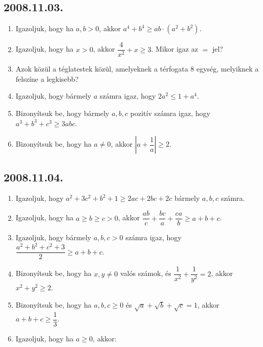 \subsection*{2008.11.03.}
\begin{enumerate}
\item Igazoljuk, hogy ha $a,b>0$, akkor $a^4+b^4\geq ab\cdot(a^2+b^2)$. 
\item Igazoljuk, hogy ha $x>0$, akkor $\dfrac{4}{x^2}+x\geq 3$. Mikor igaz az $=$ jel?
\item Azok közül a téglatestek közül, amelyeknek a térfogata $8$ egység, melyiknek a felszíne a legkisebb?
\item Igazoljuk, hogy bármely $a$ számra igaz, hogy $2a^2\leq 1+a^4$.
\item Bizonyítsuk be, hogy bármely $a,b,c$ pozitív számra igaz, hogy $a^3+b^3+c^3\geq 3abc$.
\item Bizonyítsuk be, hogy ha $a\neq 0$, akkor $\left|a+\dfrac{1}{a}\right|\geq 2$.
\end{enumerate}
\subsection*{2008.11.04.}
\begin{enumerate}
\item Igazoljuk, hogy $a^2+3c^2+b^2+1\geq 2ac+2bc+2c$ bármely $a,b,c$ számra.
\item Igazoljuk, hogy ha $a\geq b\geq c>0$, akkor $\dfrac{ab}{c}+\dfrac{bc}{a}+\dfrac{ca}{b}\geq a+b+c$.
\item Igazoljuk, hogy bármely $a,b,c>0$ számra igaz, hogy $\dfrac{a^2+b^2+c^2+3}{2}\geq a+b+c$.
\item Bizonyítsuk be, hogy ha $x,y\neq 0$ valós számok, és $\dfrac{1}{x^2}+\dfrac{1}{y^2}=2$, akkor $x^2+y^2\geq 2$.
\item Bizonyítsuk be, hogy ha $a,b,c\geq 0$ és $\sqrt{a}+\sqrt{b}+\sqrt{c}=1$, akkor $a+b+c\geq \dfrac{1}{3}$.
\item Igazoljuk, hogy ha $a\geq 0$, akkor: 
\end{enumerate}
